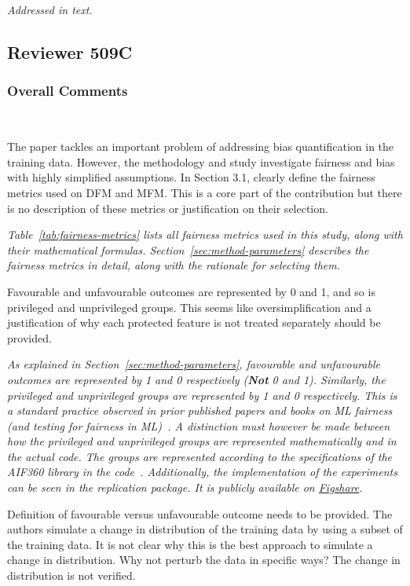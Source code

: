 \documentclass[conference]{IEEEtran}
\newcommand{\highlight}[1]{\begin{framed}%
  \noindent\emph{#1}
\end{framed}}
\begin{document}
\highlight{Addressed in text.}

\subsection{Reviewer 509C}

\subsubsection{Overall Comments}~\label{sec:509c-overall}

The paper tackles an important problem of addressing bias
quantification in the training data. However, the methodology and
study investigate fairness and bias with highly simplified
assumptions. In Section 3.1, clearly define the fairness metrics used
on DFM and MFM. This is a core part of the contribution but there is
no description of these metrics or justification on their
selection.

\highlight{Table~\ref{tab:fairness-metrics} lists all fairness metrics
used in this study, along with their mathematical
formulas. Section~\ref{sec:method-parameters} describes the fairness
metrics in detail, along with the rationale for selecting them.}

Favourable and unfavourable outcomes are represented by
0 and 1, and so is privileged and unprivileged groups. This seems like
oversimplification and a justification of why each protected feature
is not treated separately should be provided.

\highlight{As explained in Section~\ref{sec:method-parameters},
favourable and unfavourable outcomes are represented by 1 and
0 respectively (\textbf{Not} 0 and 1). Similarly, the privileged and
  unprivileged groups are represented by 1 and 0 respectively. This is
  a standard practice observed in prior published papers and books on
  ML fairness (and testing for fairness in
  ML)~\cite{barocas2019fairness,zhang2021ignorance,biswas2021fair}. A distinction
  must however be made between how the privileged and unprivileged
  groups are represented mathematically and in the actual code. The
  groups are represented according to the specifications of the
  \emph{AIF360} library in the
  code~\cite{bellamy2019ai}. Additionally, the implementation of the
  experiments can be seen in the replication package. It is publicly
  available on
  \href{https://figshare.com/s/67206f7c219b12885a6f}{Figshare}.}

Definition of favourable versus unfavourable outcome needs to be
provided. The authors simulate a change in distribution of the
training data by using a subset of the training data. It is not clear
why this is the best approach to simulate a change in
distribution. Why not perturb the data in specific ways? The change in
distribution is not verified.
\end{document}
